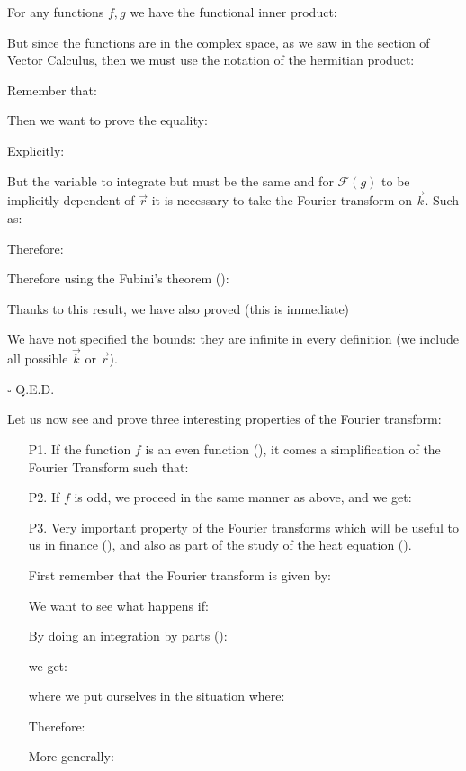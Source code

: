 	\begin{theorem}
	For any functions $f, g$ we have the functional inner product:
	
	But since the functions are in the complex space, as we saw in the section of Vector Calculus, then we must use the notation of the hermitian product:
	
	Remember that:
	
	\end{theorem}
	\begin{dem}
	Then we want to prove the equality:
	
	Explicitly:
	
	But the variable to integrate but must be the same and for $\mathcal{F}(g)$ to be implicitly dependent of $\vec{r}$ it is necessary to take the Fourier transform on $\vec{k}$. Such as:
	
	Therefore:
	
	Therefore using the Fubini's theorem ():
	
	Thanks to this result, we have also proved (this is immediate)
	
	We have not specified the bounds: they are infinite in every definition (we include all possible $\vec{k}$ or $\vec{r}$).
	\begin{flushright}
		$\square$  Q.E.D.
	\end{flushright}
	\end{dem}
	Let us now see and prove three interesting properties of the Fourier transform:
	\begin{enumerate}
		\item[P1.] If the function $f$ is an even function (), it comes a simplification of the Fourier Transform such that:
		
		
		\item[P2.] If $f$ is odd, we proceed in the same manner as above, and we get:
		
		
		\item[P3.] Very important property of the Fourier transforms which will be useful to us in finance (), and also as part of the study of the heat equation ().
		
		First remember that the Fourier transform is given by:
		
		We want to see what happens if:
		
		By doing an integration by parts ():
		
		we get:
		
		where we put ourselves in the situation where:
		
		Therefore:
		
		More generally:
		
	\end{enumerate}
